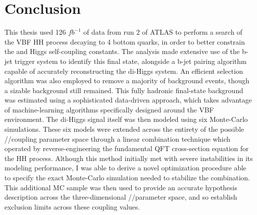 \chapter{Conclusion}\label{chapter:conclusion}

This thesis used 126 $\textit{fb}^{-1}$ of data from run 2 of ATLAS
    to perform a search of the VBF \to HH process decaying to 4 bottom quarks,
    in order to better constrain the \kl and \kvv Higgs self-coupling constants.
The analysis made extensive use of the b-jet trigger system to identify this final state,
    alongside a b-jet pairing algorithm capable of accurately reconstructing the di-Higgs system.
An efficient selection algorithm was also employed to remove a majority of background events,
    though a sizable background still remained.
This fully hadronic final-state background was estimated using a sophisticated data-driven approach,
    which takes advantage of machine-learning algorithms specifically designed around the VBF environment.
The di-Higgs signal itself was then modeled using six Monte-Carlo simulations.
These six models were extended across the entirety of the possible \kvv/\kl/\kvv coupling parameter space
    through a linear combination technique
    which operated by reverse-engineering the fundamental QFT cross-section equation for the HH process.
Although this method initially met with severe instabilities in its modeling performance,
    I was able to derive a novel optimization procedure able to specify
    the exact Monte-Carlo simulation needed to stabilize the combination.
This additional MC sample was then used to provide an accurate hypothesis description across
    the three-dimensional \kvv/\kl/\kv parameter space,
    and so establish exclusion limits across these coupling values. 

